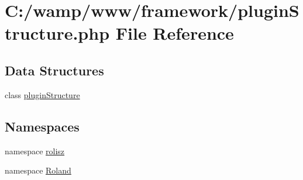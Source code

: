\hypertarget{plugin_structure_8php}{
\section{C:/wamp/www/framework/pluginStructure.php File Reference}
\label{plugin_structure_8php}
}
\subsection*{Data Structures}
\begin{DoxyCompactItemize}
\item 
class \hyperlink{classplugin_structure}{pluginStructure}
\end{DoxyCompactItemize}
\subsection*{Namespaces}
\begin{DoxyCompactItemize}
\item 
namespace \hyperlink{namespacerolisz}{rolisz}
\item 
namespace \hyperlink{namespace_roland}{Roland}
\end{DoxyCompactItemize}
